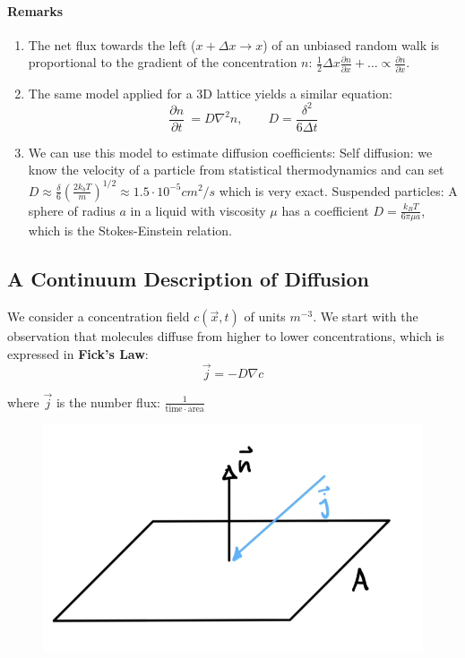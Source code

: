 \paragraph{Remarks}
\begin{enumerate}
	\setlength{\itemsep}{-5pt}
	\item The net flux towards the left ($x+\Delta x \to x$) of an unbiased random walk is proportional to the gradient of the concentration $n$: $\frac 12 \Delta x \frac{\partial n}{\partial x} + \dots \propto \frac{\partial n}{\partial x}$.\\
	\item The same model applied for a 3D lattice yields a similar equation:$$\frac{\partial n}{\partial t}\ = D\nabla ^2n,\qquad D = \frac{\delta ^2}{6\Delta t}$$
	\item We can use this model to estimate diffusion coefficients: 
	\subitem Self diffusion: we know the velocity of a particle from statistical thermodynamics and can set $D \approx \frac \delta 6 \left(\frac{2k_b T}{m}\right)^{1/2}\approx 1.5\cdot 10^{-5} cm^2/s$ which is very exact.
	\subitem Suspended particles: A sphere of radius $a$ in a liquid with viscosity $\mu$ has a coefficient $D=\frac{k_BT}{6\pi \mu a}$, which is the Stokes-Einstein relation.
\end{enumerate}



\subsection{A Continuum Description of Diffusion}

We consider a concentration field $c(\vec x,t)$ of units $m^{-3}$. We start with the observation that molecules diffuse from higher to lower concentrations, which is expressed in \textbf{Fick's Law}:
\begin{equation}
	\boxed{\vec j = -D\nabla c}
	\label{eq:ficks_law}
\end{equation}

where $\vec j$ is the number flux: $\frac{1}{\mathrm{time}\cdot \mathrm{area}}$

\begin{figure}[H]
	\centering
	\includegraphics[width=0.3\linewidth]{Sketches/FicksLaw}
	\label{fig:fickslaw}
\end{figure}

